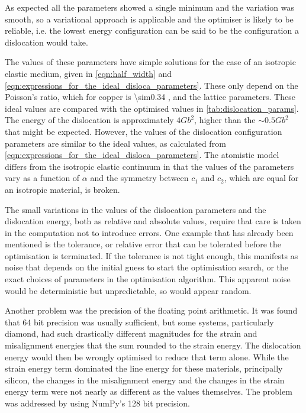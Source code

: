 As expected all the parameters showed a single minimum and the variation was smooth, so a variational approach is applicable and the optimiser is likely to be reliable, i.e. the lowest energy configuration can be said to be the configuration a dislocation would take. 






The values of these parameters have simple solutions for the case of an isotropic elastic medium, given in \autoref{eqn:half_width} and \autoref{eqn:expressions_for_the_ideal_disloca_parameters}. These only depend on the Poisson's ratio, which for copper is \num{\sim0.34} \cite{Koster1961}, and the lattice parameters. These ideal values are compared with the optimised values in \autoref{tab:dislocation_params}. The energy of the dislocation is approximately $4Gb^2$, higher than the $\sim0.5 G b^2$ that might be expected. However, the values of the dislocation configuration parameters are similar to the ideal values, as calculated from \autoref{eqn:expressions_for_the_ideal_disloca_parameters}. The atomistic model differs from the isotropic elastic continuum in that the values of the parameters vary as a function of $\alpha$ and the symmetry between $c_1$ and $c_2$, which are equal for an isotropic material, is broken.

The small variations in the values of the dislocation parameters and the dislocation energy, both as relative and absolute values, require that care is taken in the computation not to introduce errors. One example that has already been mentioned is the tolerance, or relative error that can be tolerated before the optimisation is terminated. If the tolerance is not tight enough,  this manifests as noise that depends on the initial guess to start the optimisation search, or the exact choices of parameters in the optimisation algorithm. This apparent noise would be deterministic but unpredictable, so would appear random. 

Another problem was the precision of the floating point arithmetic. It was found that \num{64} bit precision was usually sufficient, but some systems, particularly diamond, had such drastically different magnitudes for the strain and misalignment energies that the sum rounded to the strain energy. The dislocation energy would then be wrongly optimised to reduce that term alone. While the strain energy term dominated the line energy for these materials, principally silicon, the changes in the misalignment energy and the changes in the strain energy term were not nearly as different as the values themselves. The problem was addressed by using NumPy's \num{128} bit precision.  





